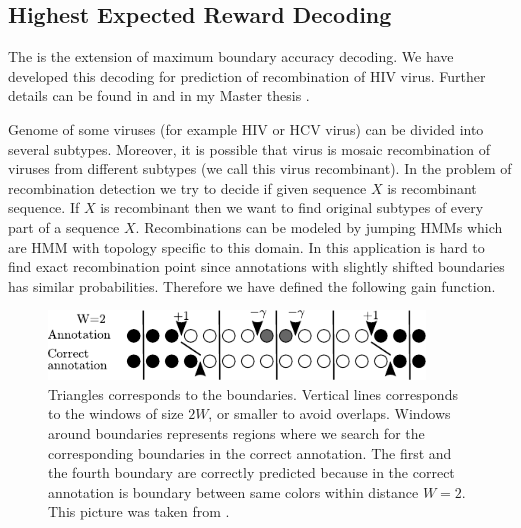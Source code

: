 \subsection{Highest Expected Reward Decoding}

The  is the extension of maximum
boundary accuracy decoding. We have developed this decoding for prediction of
recombination of HIV virus.  Further details can be found in \cite{Nanasi2010}
and in my Master thesis \cite{Nanasi2010mgr}.


Genome of some viruses (for example HIV or HCV virus) can be divided into
several subtypes. Moreover, it is possible that virus is mosaic
recombination of viruses from different subtypes (we call this virus
recombinant). In the problem of recombination detection we try to decide if
given sequence $X$ is recombinant sequence. If $X$ is recombinant then we want to find
original subtypes of every part of a sequence $X$. Recombinations can be modeled
by jumping HMMs \cite{Schultz2006} which are HMM with topology specific to this domain.
In this application is 
hard to find exact recombination point since annotations with slightly shifted
boundaries has similar probabilities. Therefore we have defined the following gain
function.

\begin{figure}
\begin{center}
\includegraphics[width=10cm]{../figures/HERDbuddy.pdf}
\end{center}
\caption[Highest Expected Reward Decoding explanation]{
Triangles corresponds to the boundaries. Vertical lines corresponds to the windows
of size $2W$, or smaller to avoid overlaps. Windows around boundaries
represents regions where we search for the corresponding boundaries in the correct
annotation.
The first and the fourth boundary are correctly predicted because in the correct
annotation is boundary between same colors within distance $W=2$.
This picture was taken from \cite{Nanasi2010mgr}.
}\label{FIGURE:HERDBUDDY}
\end{figure}

